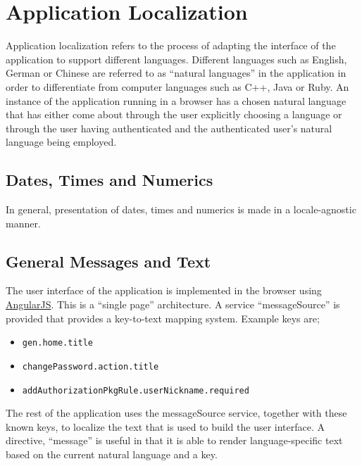 
\section{Application Localization}
\label{applicationlocalization}

Application localization refers to the process of adapting the interface of the application to support different languages.  Different languages such as English, German or Chinese are referred to as ``natural languages'' in the application in order to differentiate from computer languages such as C++, Java or Ruby.  An instance of the application running in a browser has a chosen natural language that has either come about through the user explicitly choosing a language or through the user having authenticated and the authenticated user's natural language being employed.

\subsection{Dates, Times and Numerics}

In general, presentation of dates, times and numerics is made in a locale-agnostic manner.

\subsection{General Messages and Text}

The user interface of the application is implemented in the browser using \href{http://www.angularjs.org/}{AngularJS}.  This is a ``single page'' architecture.  A service ``messageSource'' is provided that provides a key-to-text mapping system.  Example keys are;

\begin{itemize}
\item {\tt gen.home.title}
\item {\tt changePassword.action.title}
\item {\tt addAuthorizationPkgRule.userNickname.required}
\end{itemize}

The rest of the application uses the messageSource service, together with these known keys, to localize the text that is used to build the user interface.  A directive, ``message'' is useful in that it is able to render language-specific text based on the current natural language and a key.

